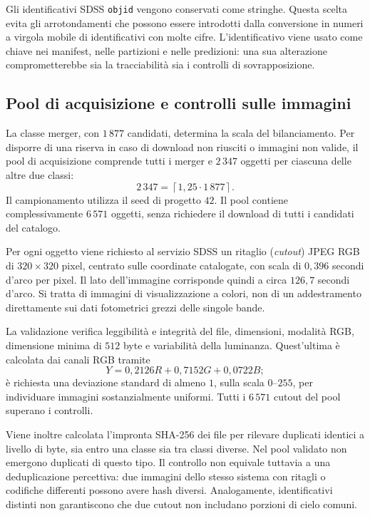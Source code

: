 Gli identificativi SDSS \texttt{objid} vengono conservati come stringhe.
Questa scelta evita gli arrotondamenti che possono essere introdotti
dalla conversione in numeri a virgola mobile di identificativi con molte
cifre. L'identificativo viene usato come chiave nei manifest, nelle
partizioni e nelle predizioni: una sua alterazione comprometterebbe sia
la tracciabilità sia i controlli di sovrapposizione.

\subsection{Pool di acquisizione e controlli sulle immagini}

La classe merger, con \(1\,877\) candidati, determina la scala del
bilanciamento. Per disporre di una riserva in caso di download non riusciti
o immagini non valide, il pool di acquisizione comprende tutti i merger
e \(2\,347\) oggetti per ciascuna delle altre due classi:
\[
  2\,347=\left\lceil 1{,}25\cdot1\,877\right\rceil.
\]
Il campionamento utilizza il seed di progetto \(42\). Il pool contiene
complessivamente \(6\,571\) oggetti, senza richiedere il download di
tutti i candidati del catalogo.

Per ogni oggetto viene richiesto al servizio SDSS un ritaglio
(\emph{cutout}) JPEG RGB di \(320\times320\) pixel, centrato sulle
coordinate catalogate, con scala di \(0{,}396\) secondi d'arco per pixel.
Il lato dell'immagine corrisponde quindi a circa \(126{,}7\) secondi
d'arco. Si tratta di immagini di visualizzazione a colori, non di un
addestramento direttamente sui dati fotometrici grezzi delle singole bande.

La validazione verifica leggibilità e integrità del file, dimensioni,
modalità RGB, dimensione minima di \(512\) byte e variabilità della
luminanza. Quest'ultima è calcolata dai canali RGB tramite
\[
  Y=0{,}2126R+0{,}7152G+0{,}0722B;
\]
è richiesta una deviazione standard di almeno \(1\), sulla scala
\(0\)--\(255\), per individuare immagini sostanzialmente uniformi.
Tutti i \(6\,571\) cutout del pool superano i controlli.

Viene inoltre calcolata l'impronta SHA-256 dei file per rilevare
duplicati identici a livello di byte, sia entro una classe sia tra
classi diverse. Nel pool validato non emergono duplicati di questo tipo.
Il controllo non equivale tuttavia a una deduplicazione percettiva:
due immagini dello stesso sistema con ritagli o codifiche differenti
possono avere hash diversi. Analogamente, identificativi distinti non
garantiscono che due cutout non includano porzioni di cielo comuni.

